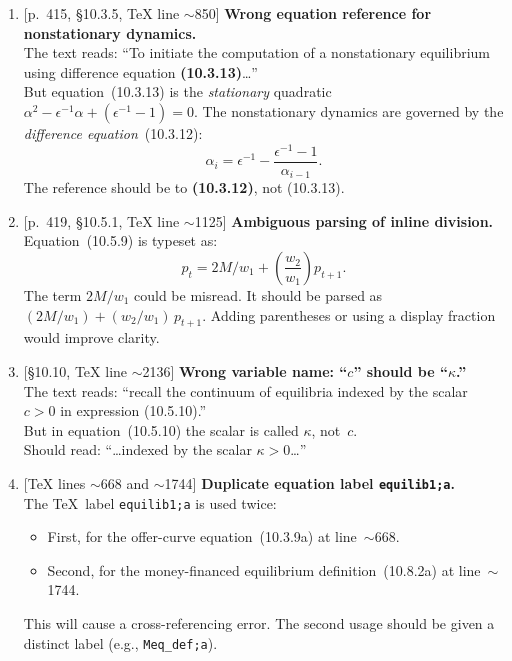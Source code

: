 \documentclass[11pt]{article}
\newcommand{\Err}[1]{\textbf{\color{red}#1}}
\newcommand{\Fix}[1]{\textbf{\color{green!50!black}#1}}
\newcommand{\loc}[1]{\textsf{\small [#1]}}
\begin{document}
\begin{enumerate}[label=\textbf{M\arabic*.}, leftmargin=2em]

\item \loc{p.~415, \S10.3.5, TeX line $\sim$850}
\textbf{Wrong equation reference for nonstationary dynamics.}\\
The text reads: ``To initiate the computation of a nonstationary equilibrium using difference equation \Err{(10.3.13)}\ldots''\\
But equation~(10.3.13) is the \emph{stationary} quadratic $\alpha^2 - \epsilon^{-1}\alpha + (\epsilon^{-1}-1) = 0$.
The nonstationary dynamics are governed by the \emph{difference equation}~(10.3.12):
\[
  \alpha_i = \epsilon^{-1} - \frac{\epsilon^{-1}-1}{\alpha_{i-1}}.
\]
The reference should be to \Fix{(10.3.12)}, not (10.3.13).

\item \loc{p.~419, \S10.5.1, TeX line $\sim$1125}
\textbf{Ambiguous parsing of inline division.}\\
Equation~(10.5.9) is typeset as:
\[
  p_t = 2M/w_1 + \left(\frac{w_2}{w_1}\right) p_{t+1}.
\]
The term $2M/w_1$ could be misread. It should be parsed as $(2M/w_1) + (w_2/w_1)\,p_{t+1}$. Adding parentheses or using a display fraction would improve clarity.

\item \loc{\S10.10, TeX line $\sim$2136}
\textbf{Wrong variable name: ``$c$'' should be ``$\kappa$.''}\\
The text reads: ``recall the continuum of equilibria indexed by the scalar \Err{$c > 0$} in expression (10.5.10).''\\
But in equation~(10.5.10) the scalar is called $\kappa$, not~$c$.\\
Should read: ``\ldots indexed by the scalar \Fix{$\kappa > 0$}\ldots''

\item \loc{TeX lines $\sim$668 and $\sim$1744}
\textbf{Duplicate equation label \texttt{equilib1;a}.}\\
The \TeX\ label \verb|equilib1;a| is used twice:
\begin{itemize}
  \item First, for the offer-curve equation~(10.3.9a) at line~$\sim$668.
  \item Second, for the money-financed equilibrium definition~(10.8.2a) at line~$\sim$1744.
\end{itemize}
This will cause a cross-referencing error.  The second usage should be given a distinct label (e.g., \verb|Meq_def;a|).

\end{enumerate}
\end{document}
